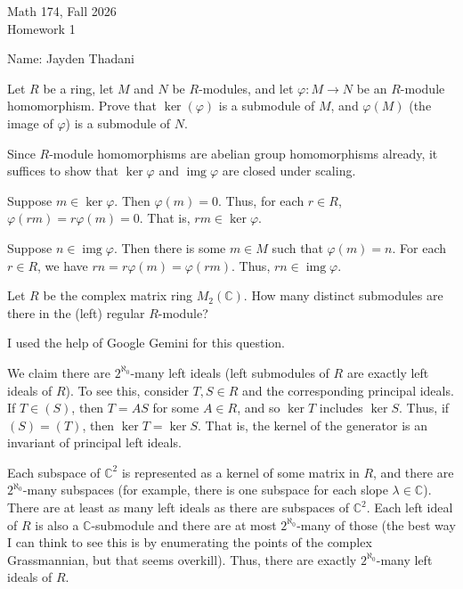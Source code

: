 \documentclass[12pt]{article}
\begin{document}
\begin{titlepage}
Math 174, Fall 2026 \\ 
Homework 1 \\

\vfill

Name: Jayden Thadani

\end{titlepage}

\begin{tcolorbox}[title=Exercise 1]
Let $R$ be a ring, let $M$ and $N$ be $R$-modules, and let $\varphi \colon M \to N$ be an $R$-module homomorphism. Prove that $\ker (\varphi)$ is a submodule of $M$, and $\varphi(M)$ (the image of $\varphi$) is a submodule of $N$. 
\end{tcolorbox}

\bigskip

Since $R$-module homomorphisms are abelian group homomorphisms already, it suffices to show that $\ker \varphi$ and $\operatorname{img} \varphi$ are closed under scaling.

Suppose $m \in \ker \varphi$. Then $\varphi(m) = 0$. Thus, for each $r \in R$, $\varphi(r m) = r \varphi(m) = 0$. That is, $r m \in \ker \varphi$.

Suppose $n \in \operatorname{img} \varphi$. Then there is some $m \in M$ such that $\varphi(m) = n$. For each $r \in R$, we have $r n = r \varphi(m) = \varphi(r m)$. Thus, $r n \in \operatorname{img} \varphi$.

\newpage

\begin{tcolorbox}[title=Exercise 2]
Let $R$ be the complex matrix ring $M_2(\mathbb{C})$. How many distinct submodules are there in the (left) regular $R$-module? 
\end{tcolorbox}

\bigskip

I used the help of Google Gemini for this question.

We claim there are $2^{\aleph_{0}}$-many left ideals (left submodules of $R$ are exactly left ideals of $R$). To see this, consider $T, S \in R$ and the corresponding principal ideals. If $T \in (S)$, then $T = AS$ for some $A \in R$, and so  $\ker T$ includes $\ker S$. Thus, if $(S) = (T)$, then $\ker T = \ker S$. That is, the kernel of the generator is an invariant of principal left ideals.

Each subspace of $\mathbb{C}^{2}$ is represented as a kernel of some matrix in $R$, and there are $2^{\aleph_{0}}$-many subspaces (for example, there is one subspace for each slope $\lambda \in \mathbb{C}$). There are at least as many left ideals as there are subspaces of $\mathbb{C}^{2}$. Each left ideal of $R$ is also a $\mathbb{C}$-submodule and there are at most $2^{\aleph_{0}}$-many of those (the best way I can think to see this is by enumerating the points of the complex Grassmannian, but that seems overkill). Thus, there are exactly $2^{\aleph_{0}}$-many left ideals of $R$.
\end{document}
